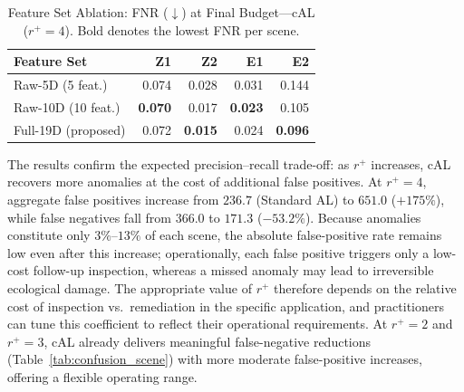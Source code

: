 \begin{table}[t]
\footnotesize
\centering
\caption{Feature Set Ablation: FNR ($\downarrow$) at Final Budget---cAL ($r^{+}=4$).
         Bold denotes the lowest FNR per scene.}
\begin{tabular}{l r r r r}
    \toprule
    \textbf{Feature Set} & \textbf{Z1} & \textbf{Z2} & \textbf{E1} & \textbf{E2} \\
    \midrule
    Raw-5D  (5 feat.)    & 0.074 & 0.028 & 0.031 & 0.144 \\
    Raw-10D (10 feat.)   & \textbf{0.070} & 0.017 & \textbf{0.023} & 0.105 \\
    Full-19D (proposed)  & 0.072 & \textbf{0.015} & 0.024 & \textbf{0.096} \\
    \bottomrule
\end{tabular}
\label{tab:ablation}
\end{table}


The results confirm the expected precision--recall trade-off: as $r^{+}$
increases, cAL recovers more anomalies at the cost of additional false
positives. At $r^{+}=4$, aggregate false positives increase from $236.7$
(Standard AL) to $651.0$ ($+175\%$), while false negatives fall from
$366.0$ to $171.3$ ($-53.2\%$). Because anomalies constitute only
$3\%$--$13\%$ of each scene, the absolute false-positive rate remains
low even after this increase; operationally, each false positive triggers
only a low-cost follow-up inspection, whereas a missed anomaly may lead
to irreversible ecological damage. The appropriate value of $r^{+}$
therefore depends on the relative cost of inspection vs.\ remediation
in the specific application, and practitioners can tune this coefficient
to reflect their operational requirements. At $r^{+}=2$ and $r^{+}=3$,
cAL already delivers meaningful false-negative reductions
(Table~\ref{tab:confusion_scene}) with more moderate false-positive
increases, offering a flexible operating range.


